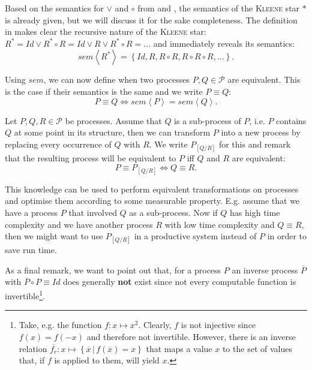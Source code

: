 Based on the semantics for $\vee$ and $\circ$ from  and , the semantics of the \textsc{Kleene} star $*$ is already given, but we will discuss it for the sake completeness. The definition in  makes clear the recursive nature of the \textsc{Kleene} star: $R^* = Id \vee R^* \circ R = Id \vee R \vee R^* \circ R =  ...$ and immediately reveals its semantics:
\begin{equation}
  \label{eqn:sem_kleene}
  sem \left\langle R^* \right\rangle = \left\{ Id, R, R \circ R, R \circ R \circ R, ... \right\}.
\end{equation}

Using $sem$, we can now define when two processes $P, Q \in \mathcal{P}$ are equivalent. This is the case if their semantics is the same and we write $P \equiv Q$:
\begin{equation}
  \label{eqn:equivalence}
  P \equiv Q \Leftrightarrow sem \left\langle P \right\rangle = sem \left\langle Q \right\rangle.
\end{equation}

Let $P, Q, R \in \mathcal{P}$ be processes. Assume that $Q$ is a sub-process of $P$, i.e. $P$ contains $Q$ at some point in its structure, then we can transform $P$ into a new process by replacing every occurrence of $Q$ with $R$. We write $P_{\left[ Q / R \right]}$ for this and remark that the resulting process will be equivalent to $P$ iff $Q$ and $R$ are equivalent:
\begin{equation}
  P \equiv P_{\left[ Q / R \right]} \Leftrightarrow Q \equiv R.
\end{equation}

This knowledge can be used to perform equivalent transformations on processes and optimise them according to some measurable property. E.g. assume that we have a process $P$ that involved $Q$ as a sub-process. Now if $Q$ has high time complexity and we have another process $R$ with low time complexity and $Q \equiv R$, then we might want to use $P_{\left[ Q / R \right]}$ in a productive system instead of $P$ in order to save run time.

As a final remark, we want to point out that, for a process $P$ an inverse process $\overline{P}$ with $\overline{P} \circ P \equiv Id$ does generally \textbf{not} exist since not every computable function is invertible\footnote{Take, e.g. the function $f \colon x \mapsto x^2$. Clearly, $f$ is not injective since $f \left( x \right) = f \left( -x \right)$ and therefore not invertible. However, there is an inverse relation $\overline{f_r} \colon x \mapsto \left\{ \overline{x} \,|\, f \left( \overline{x} \right) = x \right\}$ that maps a value $x$ to the set of values that, if $f$ is applied to them, will yield $x$.}.

